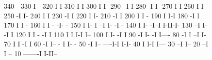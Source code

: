 \begin{figure}[p]
\begin{XMPfrac}{3.3}
     340                                    -
     330                                    I -
     320                                    I I
     310                                    I I
     300                                    I-I-
     290                                  --I  I
     280                                 -I    I-
     270                                 I      I
     260                                 I      I
     250                                -I      I-
     240                                I        I
     230                               -I        I
     220                               I         I-
     210                              -I          I
     200                              I           I -
     190                              I           I-I
     180                             -I             I
     170                             I              I                                -
     160                             I              I                          -    -I-   -
     150                             I              I-                         I  --I I- -I -
     140                             I               I-                       -I--I    I-II-I-
     130                           --I                I-                     -I              I
     120                           I                   I                  - -I               I
     110                           I                   I                  I-I                I--
     100                           I                   I-                -I                    I
      90                          -I                    I-              -I                     I----
      80                         -I                      I            --I                          I-
      70                         I                       I           -I                             I
      60                        -I                       I--       - I                              I- -
      50                       -I                          I-- ----I-I                               I-I-
      40                       I                             I-I                                        I---
      30                     --I                                                                           I--
      20                   --I                                                                               I --
      10            -------I                                                                                 I-II--
 

\end{XMPfrac}
\end{figure}
